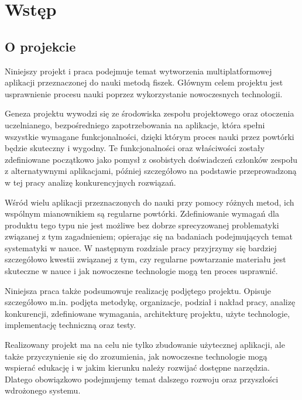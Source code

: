 \chapter{Wstęp}

\section{O projekcie}\label{ch:wstep}

Niniejszy projekt i praca podejmuje temat wytworzenia multiplatformowej aplikacji przeznaczonej do nauki metodą fiszek. Głównym celem projektu jest usprawnienie procesu nauki poprzez wykorzystanie nowoczesnych technologii.

Geneza projektu wywodzi się ze środowiska zespołu projektowego oraz otoczenia uczelnianego, bezpośredniego zapotrzebowania na aplikacje, która spełni wszystkie wymagane funkcjonalności, dzięki którym proces nauki przez powtórki będzie skuteczny i wygodny. Te funkcjonalności oraz właściwości zostały zdefiniowane początkowo jako pomysł z osobistych doświadczeń członków zespołu z alternatywnymi aplikacjami, później szczegółowo na podstawie przeprowadzoną w tej pracy analizę konkurencyjnych rozwiązań.

Wśród wielu aplikacji przeznaczonych do nauki przy pomocy różnych metod, ich wspólnym mianownikiem są regularne powtórki. Zdefiniowanie wymagań dla produktu tego typu nie jest możliwe bez dobrze sprecyzowanej problematyki związanej z tym zagadnieniem; opierając się na badaniach podejmujących temat systematyki w nauce. W następnym rozdziale pracy przyjrzymy się bardziej szczegółowo kwestii związanej z tym, czy regularne powtarzanie materiału jest skuteczne w nauce i jak nowoczesne technologie mogą ten proces usprawnić.

Niniejsza praca także podsumowuje realizację podjętego projektu. Opisuje szczegółowo m.in. podjęta metodykę, organizacje, podział i nakład pracy, analizę konkurencji, zdefiniowane wymagania, architekturę projektu, użyte technologie, implementację techniczną oraz testy.

Realizowany projekt ma na celu nie tylko zbudowanie użytecznej aplikacji, ale także przyczynienie się do zrozumienia, jak nowoczesne technologie mogą wspierać edukację i w jakim kierunku należy rozwijać dostępne narzędzia. Dlatego obowiązkowo podejmujemy temat dalszego rozwoju oraz przyszłości wdrożonego systemu.
